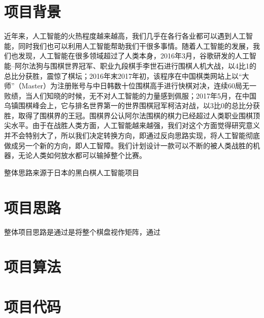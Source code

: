 \documentclass[a4paper]{article}
\begin{document}
    \begin{multicols}{2}
    \section{项目背景}
    近年来，人工智能的火热程度越来越高，我们几乎在各行各业都可以遇到人工智能，同时我们也可以利用人工智能帮助我们干很多事情。随着人工智能的发展，我们也发现，人工智能在很多领域超过了人类本身，2016年3月，谷歌研发的人工智能--阿尔法狗与围棋世界冠军、职业九段棋手李世石进行围棋人机大战，以4比1的总比分获胜，震惊了棋坛；2016年末2017年初，该程序在中国棋类网站上以“大师”（Master）为注册账号与中日韩数十位围棋高手进行快棋对决，连续60局无一败绩，当人们知晓的时候，无不对人工智能的力量感到佩服；2017年5月，在中国乌镇围棋峰会上，它与排名世界第一的世界围棋冠军柯洁对战，以3比0的总比分获胜，取得了围棋界的王冠。围棋界公认阿尔法围棋的棋力已经超过人类职业围棋顶尖水平。由于在战胜人类方面，人工智能越来越强，我们对这个方面觉得研究意义并不会特别大了，所以我们决定转换方向，即通过反向思路实现，将人工智能彻底做成另一个新的方向，即人工智障。我们计划设计一款可以不断的被人类战胜的机器，无论人类如何放水都可以输掉整个比赛。\par
    整体思路来源于日本的黑白棋人工智能项目\cite{ref1}
    \section{项目思路}
    整体项目思路是通过是将整个棋盘视作矩阵，通过
    \section{项目算法}

    \section{项目代码}
    \newpage
    \begin{thebibliography}{30}%
    \end{thebibliography}
    \newpage
\end{multicols}
\end{document}
